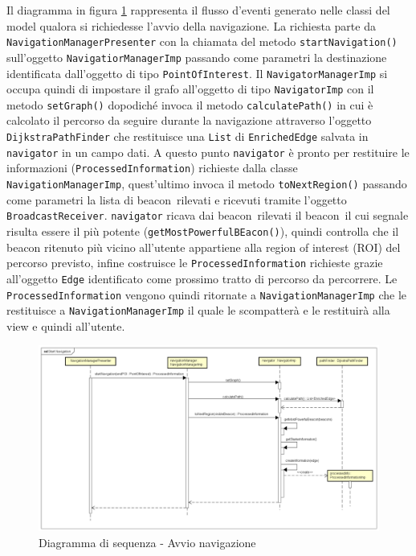 \documentclass[../DefinizioneDiProdotto.tex]{subfiles}
\begin{document}
		Il diagramma in figura \ref{StartNavigation} rappresenta il flusso d'eventi generato nelle classi del model qualora si richiedesse l'avvio della navigazione. La richiesta parte da \verb|NavigationManagerPresenter| con la chiamata del metodo \verb|startNavigation()| sull'oggetto \verb|NavigatiorManagerImp| passando come parametri la destinazione identificata dall'oggetto di tipo \verb|PointOfInterest|. Il \verb|NavigatorManagerImp| si occupa quindi di impostare il grafo all'oggetto di tipo \verb|NavigatorImp| con il metodo \verb|setGraph()| dopodiché invoca il metodo \verb|calculatePath()| in cui è calcolato il percorso da seguire durante la navigazione attraverso l'oggetto \verb|DijkstraPathFinder| che restituisce una \verb|List| di \verb|EnrichedEdge| salvata in \verb|navigator| in un campo dati.
		A questo punto \verb|navigator| è pronto per restituire le informazioni (\verb|ProcessedInformation|) richieste dalla classe \verb|NavigationManagerImp|, quest'ultimo invoca il metodo \verb|toNextRegion()| passando come parametri la lista di beacon\g\ rilevati e ricevuti tramite l'oggetto \verb|BroadcastReceiver|.
		\verb|navigator| ricava dai beacon\g\ rilevati il beacon\g\ il cui segnale risulta essere il più potente (\verb|getMostPowerfulBEacon()|), quindi controlla che il beacon ritenuto più vicino all'utente appartiene alla region of interest (ROI\g) del percorso previsto, infine costruisce le \verb|ProcessedInformation| richieste grazie all'oggetto \verb|Edge| identificato come prossimo tratto di percorso da percorrere.
		Le \verb|ProcessedInformation| vengono quindi ritornate a \verb|NavigationManagerImp| che le restituisce a \verb|NavigationManagerImp| il quale le scompatterà e le restituirà alla view e quindi all'utente.
	
		\begin{figure} [h]
			\includegraphics[width=\textwidth]{diagrams/StartNavigation}
			\caption{Diagramma di sequenza - Avvio navigazione}
			\label{StartNavigation}
		\end{figure}
		
\end{document}
